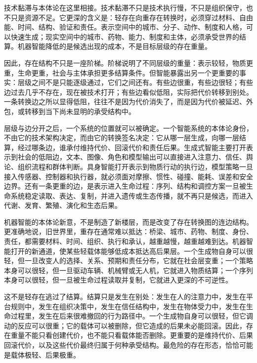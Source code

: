 技术黏滞与本体论在这里相接。技术黏滞不只是技术执行慢，不只是组织保守，也不只是资源不足。它更深的含义是：轻存在向重存在转换时，必须穿过材料、自由能、时间、结构、验证和责任。表示空间中的城市、分子、动作、制度和人格，可以快速生成；现实空间中的城市、药物、能力、制度和主体，必须承受世界的结算。机器智能降低的是候选出现的成本，不是目标层级的存在重量。

因此，存在结构不只是一座阶梯。阶梯说明了不同层级的重量：表示较轻，物质更重，生命更重，社会与主体承担更多结算条件。但智能暴露出另一个更重要的事实：层级之间不是只能逐级通过，它们之间还有。有些边很重，有些边很轻；有些边过去几乎不存在，现在被技术打开；有些边看似低阻，实际把代价转移到别处。一条转换边之所以显得低阻，往往不是因为代价消失了，而是因为代价被延迟、外包，或转移到当下尚未显明的承受结构中。

层级与边分开之后，一个系统的位置就可以被确定。一个智能系统的本体论身份，不由它的技术架构决定，而由它的转换签名决定：它从哪一层生成，向哪一层结算，经过哪条边，谁承付维持代价、回滚代价和责任后果。生成式智能主要打开表示到社会的低阻边，文本、图像、角色和模型输出可以直接进入注意力、信任、舆论、组织流程和群体判断。具身智能打开表示到物质行动的执行边，模型策略一旦接入传感器、控制器和执行器，就必须面对摩擦、惯性、碰撞、能耗、误差和安全边界。还有一条更重的边，是表示进入生命过程：序列、结构和调控方案一旦被生命系统稳定读取、表达、复制，并进入遗传或生态传播，就不再只是候选，而进入代谢、发育、繁殖、演化和生态后果。

机器智能的本体论新意，不是制造了新楼层，而是改变了存在转换图的连边结构。更准确地说，旧世界里，重存在通常难以抵达：桥梁、城市、药物、制度、身份、责任，都需要材料、时间、组织、执行和承认，越重越慢，越重越难到达。机器智能打开的新通道，使某些轻载体能够低成本抵达高后果层。一个生成物自身可以很轻，但一旦改变人的选择、关系、预期和责任分布，它就在社会层变重；一个策略本身可以很轻，但一旦驱动车辆、机械臂或无人机，它就进入物质结算；一个序列本身可以很轻，但一旦被生命过程读取并复制，它就进入更深的不可逆性。


这不是轻存在逃过了结算。结算只是发生在别处：发生在人的注意力中，发生在平台规则中，发生在组织决策中，发生在信任结构中，发生在物体受力中，发生在生命过程里，发生在后来很难撤回的行为路径中。一个生成物自身可以很轻，但它调动的反应可以很重；它的载体可以被删除，但它造成的后果未必能回滚。因此，存在重量不能只看创建代价，也不能只看载体能否删除。更重要的是维持代价、后果回滚代价，以及这些代价最终归属于何种承受结构。最危险的存在形态，恰恰可能是载体极轻、后果极重。

